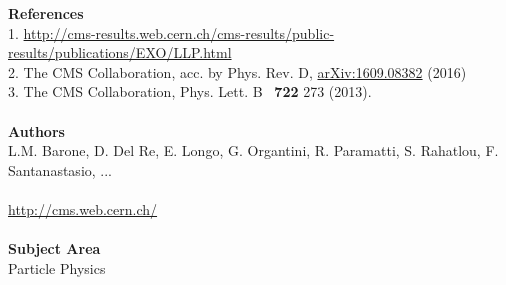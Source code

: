 \documentclass[twocolumn,twoside,10pt,nodate]{article}
\begin{document}


\vfill
\small{
\noindent
\textbf{References}
\\
1. \url{http://cms-results.web.cern.ch/cms-results/public-results/publications/EXO/LLP.html}\\
2. The CMS Collaboration, acc. by Phys. Rev. D,
\href{https://arxiv.org/abs/1609.08382}{arXiv:1609.08382} (2016) \\
3. The CMS Collaboration, Phys. Lett. B \ \textbf{722} 273 (2013). 
\\
\\
\noindent
\textbf{Authors}
\\
L.M. Barone, D. Del Re, E. Longo, G. Organtini,
R. Paramatti, S. Rahatlou, F. Santanastasio, ...
\\
\\
\url{http://cms.web.cern.ch/}
\\
\\
\noindent
\textbf{Subject Area}
\\
%
%
Particle Physics
%
}
\end{document}
